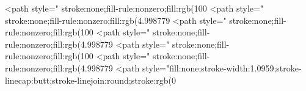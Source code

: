 <path style=" stroke:none;fill-rule:nonzero;fill:rgb(100%
<path style=" stroke:none;fill-rule:nonzero;fill:rgb(4.998779%
<path style=" stroke:none;fill-rule:nonzero;fill:rgb(100%
<path style=" stroke:none;fill-rule:nonzero;fill:rgb(4.998779%
<path style=" stroke:none;fill-rule:nonzero;fill:rgb(100%
<path style=" stroke:none;fill-rule:nonzero;fill:rgb(4.998779%
<path style="fill:none;stroke-width:1.0959;stroke-linecap:butt;stroke-linejoin:round;stroke:rgb(0%
